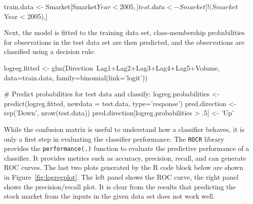 \begin{samepage}
\begin{Rcode}
train.data <- Smarket[Smarket$Year < 2005,]
test.data <- Smarket[!(Smarket$Year < 2005),]
\end{Rcode}
\end{samepage}

\noindent Next, the model is fitted to the training data set, class-membership probabilities for observations in the test data set are then predicted, and the observations are classified using a decision rule:
\begin{samepage}
\begin{Rcode}
logreg.fitted <- 
   glm(Direction~Lag1+Lag2+Lag3+Lag4+Lag5+Volume, data=train.data,  
            family=binomial(link='logit'))

# Predict probabilities for test data and classify:
logreg.probabilities <- predict(logreg.fitted, newdata = test.data,
                                  type='response')
pred.direction <- rep('Down', nrow(test.data))
pred.direction[logreg.probabilities > .5] <- 'Up'
\end{Rcode}
\end{samepage}

While the confusion matrix is useful to understand how a classifier behaves, it is only a first step in evaluating the classifier performance. The \texttt{ROCR} library provides the \texttt{performance(.)} function to evaluate the predictive performance of a classifier. It provides metrics such as accuracy, precision, recall, and can generate ROC curves. The last two plots generated by the R code block below are shown in Figure~\ref{fig:logregplot}. The left panel shows the ROC curve, the right panel shows the precision/recall plot. It is clear from the results that predicting the stock market from the inputs in the given data set does not work well.

\begin{samepage}
\end{samepage}


